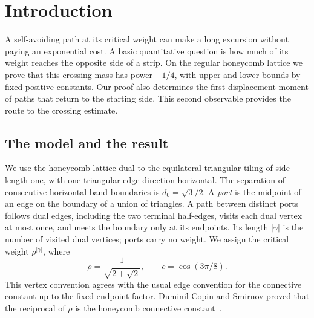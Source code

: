 \section{Introduction}
A self-avoiding path at its critical weight can make a long excursion
without paying an exponential cost. A basic quantitative question is how
much of its weight reaches the opposite side of a strip. On the regular
honeycomb lattice we prove that this crossing mass has power $-1/4$,
with upper and lower bounds by fixed positive constants. Our proof also
determines the first displacement moment of paths that return to the
starting side. This second observable provides the route to the crossing
estimate.

\subsection{The model and the result}
We use the honeycomb lattice dual to the equilateral triangular tiling
of side length one, with one triangular edge direction horizontal.
The separation of consecutive horizontal band boundaries is
$d_0=\sqrt3/2$. A \emph{port} is the midpoint of an edge on the boundary
of a union of triangles. A path between distinct ports follows dual edges,
including the two terminal half-edges, visits each dual vertex at most
once, and meets the boundary only at its endpoints. Its length
$|\gamma|$ is the number of visited dual vertices; ports carry no weight.
We assign the critical weight $\rho^{|\gamma|}$, where
\begin{equation}\label{eq:critical-weight}
 \rho=\frac1{\sqrt{2+\sqrt2}},\qquad c=\cos(3\pi/8).
\end{equation}
This vertex convention agrees with the usual edge convention for the
connective constant up to the fixed endpoint factor. Duminil-Copin and
Smirnov proved that the reciprocal of $\rho$ is the honeycomb connective
constant~\cite{DCS2012}.

